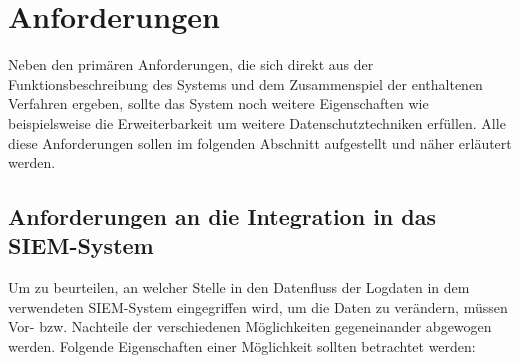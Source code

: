 \section{Anforderungen}

\label{sec_impl_requirements}

Neben den primären Anforderungen, die sich direkt aus der Funktionsbeschreibung des Systems und dem Zusammenspiel der enthaltenen Verfahren ergeben, sollte das System noch weitere Eigenschaften wie beispielsweise die Erweiterbarkeit um weitere Datenschutztechniken erfüllen. Alle diese Anforderungen sollen im folgenden Abschnitt aufgestellt und näher erläutert werden.

\subsection{Anforderungen an die Integration in das SIEM-System}

\label{subsec_impl_requirements_ossimintegration}


Um zu beurteilen, an welcher Stelle in den Datenfluss der Logdaten in dem verwendeten SIEM-System  eingegriffen wird, um die Daten zu verändern, müssen Vor- bzw. Nachteile der verschiedenen Möglichkeiten gegeneinander abgewogen werden. Folgende Eigenschaften einer Möglichkeit sollten betrachtet werden:

